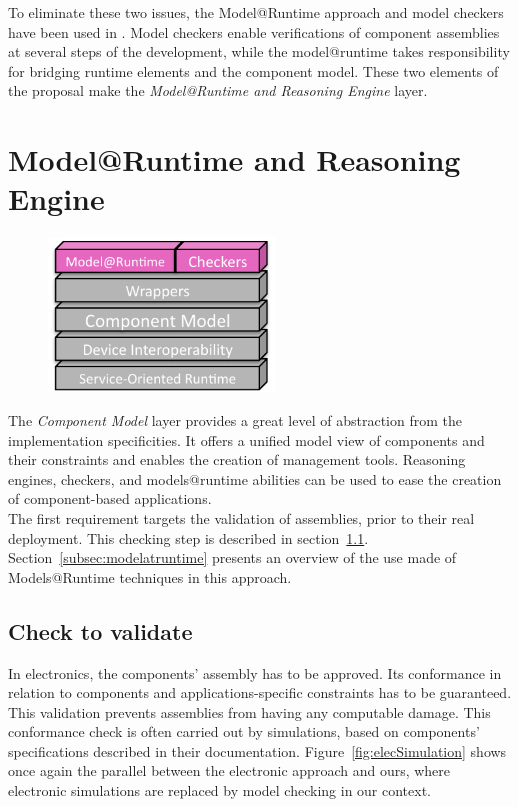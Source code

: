 To eliminate these two issues, the Model@Runtime approach and model checkers have been used in \enti{}. Model checkers enable verifications of component assemblies at several steps of the development, while the model@runtime takes responsibility for bridging runtime elements and the component model. These two elements of the proposal make the {\it Model@Runtime and Reasoning Engine} layer.\\


\section{Model@Runtime and Reasoning Engine}
\label{sec:martAndReasoning}

\begin{figure}
  \vspace{-5mm}
  \includegraphics[width=60mm]{part2/pics/layers/MartReasoners.pdf}
  \vspace{-5mm}
\end{figure}

The {\it Component Model} layer provides a great level of abstraction from the implementation specificities. It offers a unified model view of components and their constraints and enables the creation of management tools. Reasoning engines, checkers, and models@runtime abilities can be used to ease the creation of component-based applications.\\
The first requirement targets the validation of assemblies, prior to their real deployment. This checking step is described in section~\ref{subsec:check_to_validate}. Section~\ref{subsec:modelatruntime} presents an overview of the use made of Models@Runtime techniques in this approach.


\subsection{Check to validate}
\label{subsec:check_to_validate}

In electronics, the components' assembly has to be approved. Its conformance in relation to components and applications-specific constraints has to be guaranteed. This validation prevents assemblies from having any computable damage. This conformance check is often carried out by simulations, based on components' specifications described in their documentation. Figure~\ref{fig:elecSimulation} shows once again the parallel between the electronic approach and ours, where electronic simulations are replaced by model checking in our context.\\


